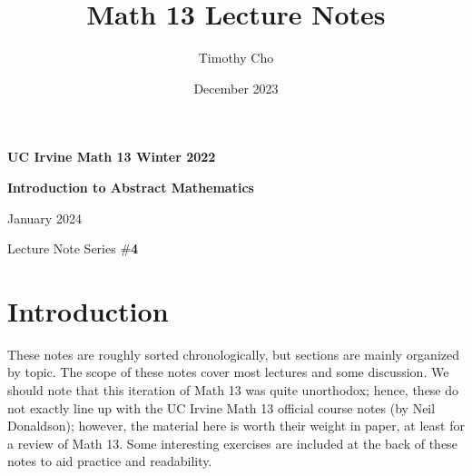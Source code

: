 \documentclass{article}
\title{Math 13 Lecture Notes}
\author{Timothy Cho}
\date{December 2023}
\begin{document}
\begin{titlepage}
    \begin{center}
        \vspace*{1cm}
            
        \Huge
        \textbf{UC Irvine Math 13 Winter 2022}
        
        \vspace{0.1 cm}
        \huge
        \textbf{Introduction to Abstract Mathematics}
        \vspace{0.4cm}
            
        \vspace{1.5cm}
        \Large    

        
            
        \vfill
            

            
        \vspace{0.8cm}
            

        \Large
        January 2024

        Lecture Note Series \#\textbf{4}
            
    \end{center}
\end{titlepage}
\section*{Introduction}
These notes are roughly sorted chronologically, but sections are mainly organized by topic. The scope of these notes cover most lectures and some discussion. We should note that this iteration of Math 13 was quite unorthodox; hence, these do not exactly line up with the UC Irvine Math 13 official course notes (by Neil Donaldson); however, the material here is worth their weight in paper, at least for a review of Math 13. Some interesting exercises are included at the back of these notes to aid practice and readability.
\end{document}
